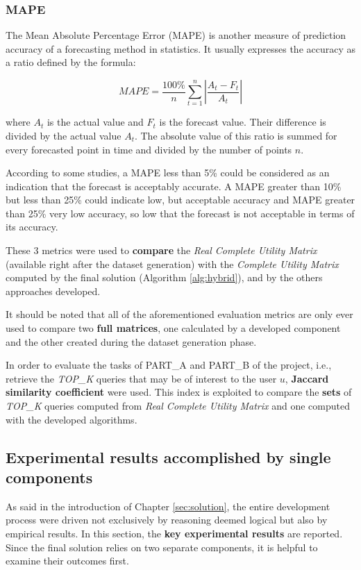 \subsubsection{MAPE}

The Mean Absolute Percentage Error (MAPE) is another measure of prediction accuracy of a forecasting method in statistics. It usually expresses the accuracy as a ratio defined by the formula:

$$MAPE = \frac{100\%}{n} \sum_{t=1}^{n}\left | \frac{A_t - F_t}{A_t}  \right | $$

where $A_t$ is the actual value and $F_t$ is the forecast value. Their difference is divided by the actual value $A_t$. The absolute value of this ratio is summed for every forecasted point in time and divided by the number of points $n$.

According to some studies, a MAPE less than 5\% could be considered as an indication that the forecast is acceptably accurate. A MAPE greater than 10\% but less than 25\% could indicate low, but acceptable accuracy and MAPE greater than 25\% very low accuracy, so low that the forecast is not acceptable in terms of its accuracy. \cite{MAPE_VALUES}


These 3 metrics were used to \textbf{compare} the \textit{Real Complete Utility Matrix} (available right after the dataset generation) with the \textit{Complete Utility Matrix} computed by the final solution (Algorithm \ref{alg:hybrid}), and by the others approaches developed.

It should be noted that all of the aforementioned evaluation metrics are only ever used to compare two \textbf{full matrices}, one calculated by a developed component and the other created during the dataset generation phase.

In order to evaluate the tasks of PART\_A and PART\_B of the project, i.e., retrieve the \textit{TOP\_K} queries that may be of interest to the user $u$, \textbf{Jaccard similarity coefficient} were used.
This index is exploited to compare the \textbf{sets} of \textit{TOP\_K} queries computed from \textit{Real Complete Utility Matrix} and one computed with the developed algorithms.

\subsection{Experimental results accomplished by single components}

As said in the introduction of Chapter \ref{sec:solution}, the entire development process were driven not exclusively by reasoning deemed logical but also by empirical results. In this section, the \textbf{key experimental results} are reported.
Since the final solution relies on two separate components, it is helpful to examine their outcomes first.

